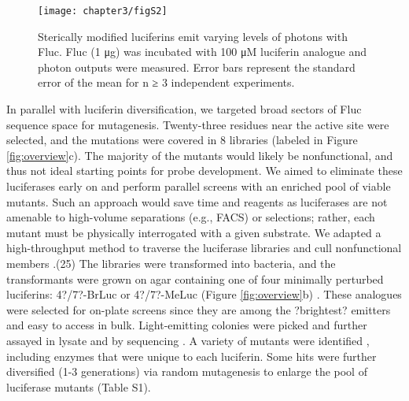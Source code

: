 \begin{figure}[htb]
\texttt{[image: chapter3/figS2]}
\centering
\caption[Sterically modified luciferins emit varying levels of photons with Fluc]{Sterically modified luciferins emit varying levels of photons with Fluc. Fluc (1 μg) was incubated with 100 μM luciferin analogue and photon outputs were measured. Error bars represent the standard error of the mean for n ≥ 3 independent experiments.}
  \label{fig:S2}
\end{figure}
\par
In parallel with luciferin diversification, we targeted broad sectors of Fluc sequence space for mutagenesis. Twenty-three residues near the active site were selected, and the mutations were covered in 8 libraries (labeled in Figure \ref{fig:overview}c). The majority of the mutants would likely be nonfunctional, and thus not ideal starting points for probe development. We aimed to eliminate these luciferases early on and perform parallel screens with an enriched pool of viable mutants. Such an approach would save time and reagents as luciferases are not amenable to high-volume separations (e.g., FACS) or selections; rather, each mutant must be physically interrogated with a given substrate. We adapted a high-throughput method to traverse the luciferase libraries and cull nonfunctional members
.\cite{Jones:2017be}(25) The libraries were transformed into bacteria, and the transformants were grown on agar containing one of four minimally perturbed luciferins: 4?/7?-BrLuc or 4?/7?-MeLuc (Figure \ref{fig:overview}b)
. These analogues were selected for on-plate screens since they are among the ?brightest? emitters and easy to access in bulk. Light-emitting colonies were picked and further assayed in lysate and by sequencing
. A variety of mutants were identified
, including enzymes that were unique to each luciferin. Some hits were further diversified (1-3 generations) via random mutagenesis to enlarge the pool of luciferase mutants (Table S1). %

